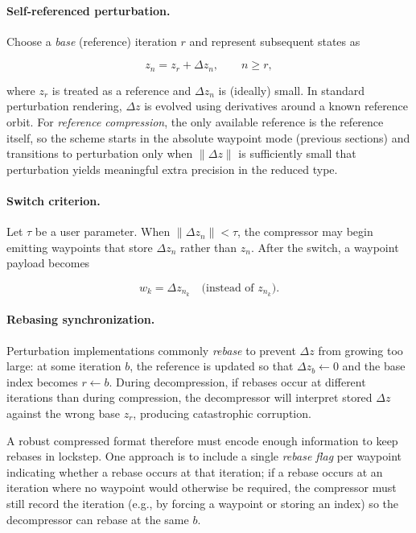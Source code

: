 \paragraph{Self-referenced perturbation.}
Choose a \emph{base} (reference) iteration \(r\) and represent subsequent states as

\begin{equation}
  z_n = z_r + \Delta z_n, \qquad n \ge r,
\end{equation}

where \(z_r\) is treated as a reference and \(\Delta z_n\) is (ideally) small.
In standard perturbation rendering, \(\Delta z\) is evolved using derivatives
around a known reference orbit.  For \emph{reference compression}, the only
available reference is the reference itself, so the scheme starts in the
absolute waypoint mode (previous sections) and transitions to perturbation only
when \(\lVert \Delta z \rVert\) is sufficiently small that perturbation yields
meaningful extra precision in the reduced type.

\paragraph{Switch criterion.}
Let \(\tau\) be a user parameter.  When \(\lVert \Delta z_n \rVert < \tau\), the
compressor may begin emitting waypoints that store \(\Delta z_n\) rather than
\(z_n\).  After the switch, a waypoint payload becomes

\begin{equation}
  w_k = \Delta z_{n_k} \quad\text{(instead of } z_{n_k}\text{)}.
\end{equation}

\paragraph{Rebasing synchronization.}
Perturbation implementations commonly \emph{rebase} to prevent \(\Delta z\) from
growing too large: at some iteration \(b\), the reference is updated so that
\(\Delta z_b \leftarrow 0\) and the base index becomes \(r \leftarrow b\).
During decompression, if rebases occur at different iterations than during
compression, the decompressor will interpret stored \(\Delta z\) against the
wrong base \(z_r\), producing catastrophic corruption.

A robust compressed format therefore must encode enough information to keep
rebases in lockstep.  One approach is to include a single \emph{rebase flag} per
waypoint indicating whether a rebase occurs at that iteration; if a rebase
occurs at an iteration where no waypoint would otherwise be required, the
compressor must still record the iteration (e.g., by forcing a waypoint or
storing an index) so the decompressor can rebase at the same \(b\).

